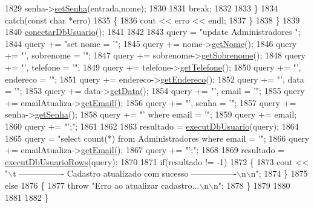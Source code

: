 \begin{DoxyCode}
1829       senha->\mbox{\hyperlink{class_senha_a01bbc2a82c5f405b68f33fe0dc538ec1}{setSenha}}(entrada,nome);
1830 
1831       \textcolor{keywordflow}{break};
1832 
1833     \}
1834     \textcolor{keywordflow}{catch}(\textcolor{keyword}{const} \textcolor{keywordtype}{char} *erro)
1835     \{
1836       cout << erro << endl;
1837     \}
1838   \}
1839 
1840   \mbox{\hyperlink{comando_sql_8cpp_a4f89ddcbc4cf8f2587d89f72f8c7900d}{conectarDbUsuario}}();
1841 
1842 
1843   query = \textcolor{stringliteral}{"update Administradores "};
1844   query += \textcolor{stringliteral}{"set nome = '"};
1845   query += nome->\mbox{\hyperlink{class_nome_aad41176173eec20cbbae1576447a3697}{getNome}}();
1846   query += \textcolor{stringliteral}{"', sobrenome = '"};
1847   query += sobrenome->\mbox{\hyperlink{class_sobrenome_a954491366ce07f6715f32a97d67edf04}{getSobrenome}}();
1848   query += \textcolor{stringliteral}{"', telefone = '"};
1849   query += telefone->\mbox{\hyperlink{class_telefone_a3e7acb7a3b658ef9e5d73b7e1d2948e7}{getTelefone}}();
1850   query += \textcolor{stringliteral}{"', endereco = '"};
1851   query += endereco->\mbox{\hyperlink{class_endereco_aa1ccbda52f9559a68379c54e7e914d19}{getEndereco}}();
1852   query += \textcolor{stringliteral}{"', data = '"};
1853   query += data->\mbox{\hyperlink{class_data_afc7b15a5e81334858e48709b2f45cdc3}{getData}}();
1854   query += \textcolor{stringliteral}{"', email = '"};
1855   query += emailAtualiza->\mbox{\hyperlink{class_email_aa9a0e1a66b4efde65cf017bdd1c6c625}{getEmail}}();
1856   query += \textcolor{stringliteral}{"', senha = '"};
1857   query += senha->\mbox{\hyperlink{class_senha_a8786b3d03b1652e73df1cdce46cbbaaf}{getSenha}}();
1858   query += \textcolor{stringliteral}{"' where email = '"};
1859   query += email;
1860   query += \textcolor{stringliteral}{"';"};
1861 
1862 
1863   resultado = \mbox{\hyperlink{comando_sql_8cpp_a748197580e7f9acdbf48c78de1f7924b}{executDbUsuario}}(query);
1864 
1865   query = \textcolor{stringliteral}{"select count(*) from Administradores where email = '"};
1866   query += emailAtualiza->\mbox{\hyperlink{class_email_aa9a0e1a66b4efde65cf017bdd1c6c625}{getEmail}}();
1867   query += \textcolor{stringliteral}{"';"};
1868 
1869   resultado = \mbox{\hyperlink{comando_sql_8cpp_af54952694f2fa7d76f969fb74b853cb9}{executDbUsuarioRows}}(query);
1870 
1871   \textcolor{keywordflow}{if}(resultado != -1)
1872   \{
1873     cout << \textcolor{stringliteral}{"\(\backslash\)t ---------------- Cadastro atualizado com sucesso ----------------\(\backslash\)n\(\backslash\)n"};
1874   \}
1875   \textcolor{keywordflow}{else}
1876   \{
1877     \textcolor{keywordflow}{throw} \textcolor{stringliteral}{"Erro ao atualizar cadastro...\(\backslash\)n\(\backslash\)n"};
1878   \}
1879 
1880 
1881 
1882 \}
\end{DoxyCode}
\mbox{\label{class_servico_usuarios_administrador_a0a20923a2c556fa62587fac48b6e55da}} 
